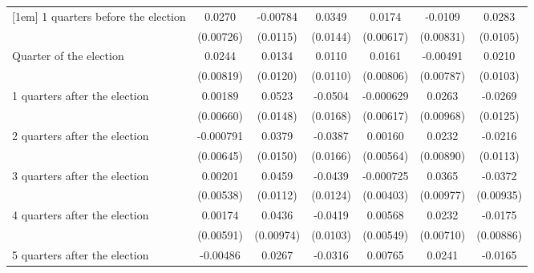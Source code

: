 \begin{table}[!ht]
\begin{tabular}{l*{6}{c}}
[1em]
 1 quarters before the election&      0.0270\sym{***}&    -0.00784         &      0.0349\sym{*}  &      0.0174\sym{**} &     -0.0109         &      0.0283\sym{**} \\
                    &   (0.00726)         &    (0.0115)         &    (0.0144)         &   (0.00617)         &   (0.00831)         &    (0.0105)         \\
[1em]
Quarter of the election&      0.0244\sym{**} &      0.0134         &      0.0110         &      0.0161\sym{*}  &    -0.00491         &      0.0210\sym{*}  \\
                    &   (0.00819)         &    (0.0120)         &    (0.0110)         &   (0.00806)         &   (0.00787)         &    (0.0103)         \\
[1em]
 1 quarters after the election&     0.00189         &      0.0523\sym{***}&     -0.0504\sym{**} &   -0.000629         &      0.0263\sym{**} &     -0.0269\sym{*}  \\
                    &   (0.00660)         &    (0.0148)         &    (0.0168)         &   (0.00617)         &   (0.00968)         &    (0.0125)         \\
[1em]
 2 quarters after the election&   -0.000791         &      0.0379\sym{*}  &     -0.0387\sym{*}  &     0.00160         &      0.0232\sym{**} &     -0.0216         \\
                    &   (0.00645)         &    (0.0150)         &    (0.0166)         &   (0.00564)         &   (0.00890)         &    (0.0113)         \\
[1em]
 3 quarters after the election&     0.00201         &      0.0459\sym{***}&     -0.0439\sym{***}&   -0.000725         &      0.0365\sym{***}&     -0.0372\sym{***}\\
                    &   (0.00538)         &    (0.0112)         &    (0.0124)         &   (0.00403)         &   (0.00977)         &   (0.00935)         \\
[1em]
 4 quarters after the election&     0.00174         &      0.0436\sym{***}&     -0.0419\sym{***}&     0.00568         &      0.0232\sym{**} &     -0.0175\sym{*}  \\
                    &   (0.00591)         &   (0.00974)         &    (0.0103)         &   (0.00549)         &   (0.00710)         &   (0.00886)         \\
[1em]
 5 quarters after the election&    -0.00486         &      0.0267\sym{*}  &     -0.0316\sym{**} &     0.00765         &      0.0241\sym{**} &     -0.0165         \\

\end{tabular}
\end{table}
